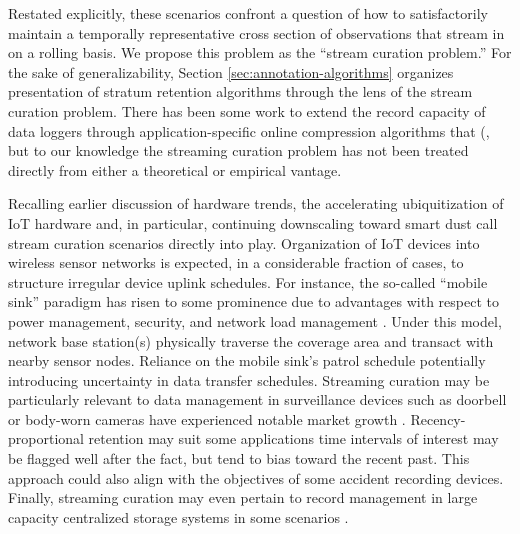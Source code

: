 Restated explicitly, these scenarios confront a question of how to satisfactorily maintain a temporally representative cross section of observations that stream in on a rolling basis.
We propose this problem as the ``stream curation problem.''
For the sake of generalizability, Section \ref{sec:annotation-algorithms} organizes presentation of stratum retention algorithms through the lens of the stream curation problem.
There has been some work to extend the record capacity of data loggers through application-specific online compression algorithms that (\citep{hadiatna2016design}, but to our knowledge the streaming curation problem has not been treated directly from either a theoretical or empirical vantage.

Recalling earlier discussion of hardware trends, the accelerating ubiquitization of IoT hardware and, in particular, continuing downscaling toward smart dust call stream curation scenarios directly into play.
Organization of IoT devices into wireless sensor networks is expected, in a considerable fraction of cases, to structure irregular device uplink schedules.
For instance, the so-called ``mobile sink'' paradigm has risen to some prominence due to advantages with respect to power management, security, and network load management \citep{jain2022survey}.
Under this model, network base station(s) physically traverse the coverage area and transact with nearby sensor nodes.
Reliance on the mobile sink's patrol schedule potentially introducing uncertainty in data transfer schedules.
Streaming curation may be particularly relevant to data management in surveillance devices such as doorbell or body-worn cameras have experienced notable market growth \citep{calacci2022cop,lum2019research}.
Recency-proportional retention may suit some applications time intervals of interest may be flagged well after the fact, but tend to bias toward the recent past.
This approach could also align with the objectives of some accident recording devices.
Finally, streaming curation may even pertain to record management in large capacity centralized storage systems in some scenarios \citep{bhat2018data}.

